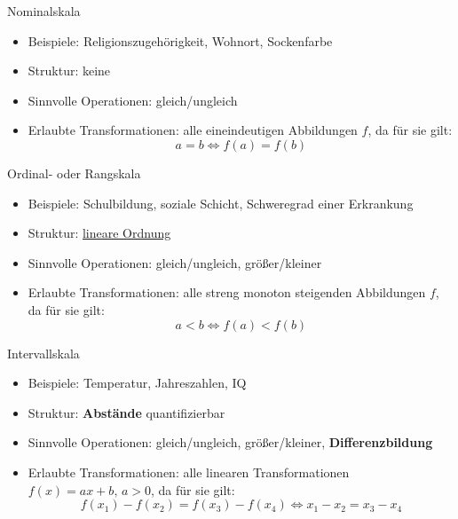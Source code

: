 \documentclass[
  10pt,
  ignorenonframetext,
]{beamer}
\providecommand{\tightlist}{%
  \setlength{\itemsep}{0pt}\setlength{\parskip}{0pt}}
\begin{document}
\begin{frame}{Nominalskala}
\protect\hypertarget{nominalskala}{}
\begin{itemize}
\tightlist
\item
  Beispiele: Religionszugehörigkeit, Wohnort, Sockenfarbe
\item
  Struktur: keine
\item
  Sinnvolle Operationen: gleich/ungleich
\item
  Erlaubte Transformationen: alle eineindeutigen Abbildungen \(f\), da
  für sie gilt: \begin{equation*}
               a = b \iff f(a) = f(b)
           \end{equation*}
\end{itemize}
\end{frame}

\begin{frame}{Ordinal- oder Rangskala}
\protect\hypertarget{ordinal--oder-rangskala}{}
\begin{itemize}
\tightlist
\item
  Beispiele: Schulbildung, soziale Schicht, Schweregrad einer Erkrankung
\item
  Struktur:
  \href{https://de.wikipedia.org/wiki/Ordnungsrelation\#Totalordnung}{lineare
  Ordnung}
\item
  Sinnvolle Operationen: gleich/ungleich, größer/kleiner
\item
  Erlaubte Transformationen: alle streng monoton steigenden Abbildungen
  \(f\), da für sie gilt: \begin{equation*}
               a<b \iff f(a) < f(b)
           \end{equation*}
\end{itemize}
\end{frame}

\begin{frame}{Intervallskala}
\protect\hypertarget{intervallskala}{}
\begin{itemize}
\tightlist
\item
  Beispiele: Temperatur, Jahreszahlen, IQ
\item
  Struktur: \textbf{Abstände} quantifizierbar
\item
  Sinnvolle Operationen: gleich/ungleich, größer/kleiner,
  \textbf{Differenzbildung}
\item
  Erlaubte Transformationen: alle linearen Transformationen
  \(f(x) = ax+b,\, a > 0\), da für sie gilt: \begin{equation*}
               f(x_1) - f(x_2) = f(x_3) - f(x_4) \iff x_1 - x_2 = x_3 - x_4
           \end{equation*}
\end{itemize}
\end{frame}
\end{document}
